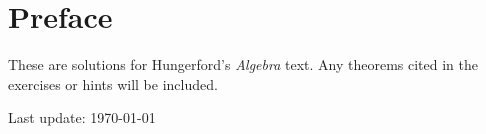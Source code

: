\documentclass[11pt,twoside,openany]{memoir}
\begin{document}
    \chapter*{Preface}
        These are solutions for Hungerford's \textit{Algebra} text. Any theorems cited in the exercises or hints will be included.
    \tableofcontents
    

    \vfill
    \specialdate
    Last update: \today

    
    \appendix
    
\end{document}
